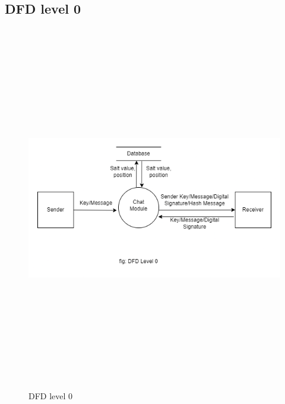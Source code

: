 \subsection{DFD level 0}
\begin{figure}[H]
	\centering
	\includegraphics[width=130mm, height=160mm]{images/dfd0.png}
	\caption{DFD level 0} %
	\label{figdfd0} %
\end{figure}

